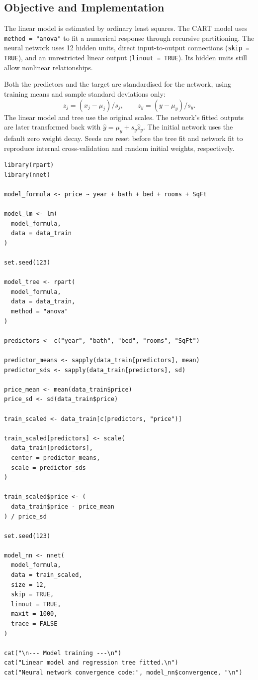\documentclass[11pt,a4paper]{article}
\begin{document}
\subsection{Objective and Implementation}
The linear model is estimated by ordinary least squares. The CART model uses \texttt{method = "anova"} to fit a numerical response through recursive partitioning. The neural network uses 12 hidden units, direct input-to-output connections (\texttt{skip = TRUE}), and an unrestricted linear output (\texttt{linout = TRUE}). Its hidden units still allow nonlinear relationships.

Both the predictors and the target are standardised for the network, using training means and sample standard deviations only:
\[
z_j=(x_j-\mu_j)/s_j,\qquad z_y=(y-\mu_y)/s_y.
\]
The linear model and tree use the original scales. The network's fitted outputs are later transformed back with $\hat y=\mu_y+s_y\hat z_y$. The initial network uses the default zero weight decay. Seeds are reset before the tree fit and network fit to reproduce internal cross-validation and random initial weights, respectively.
\begin{lstlisting}
library(rpart)
library(nnet)

model_formula <- price ~ year + bath + bed + rooms + SqFt

model_lm <- lm(
  model_formula,
  data = data_train
)

set.seed(123)

model_tree <- rpart(
  model_formula,
  data = data_train,
  method = "anova"
)

predictors <- c("year", "bath", "bed", "rooms", "SqFt")

predictor_means <- sapply(data_train[predictors], mean)
predictor_sds <- sapply(data_train[predictors], sd)

price_mean <- mean(data_train$price)
price_sd <- sd(data_train$price)

train_scaled <- data_train[c(predictors, "price")]

train_scaled[predictors] <- scale(
  data_train[predictors],
  center = predictor_means,
  scale = predictor_sds
)

train_scaled$price <- (
  data_train$price - price_mean
) / price_sd

set.seed(123)

model_nn <- nnet(
  model_formula,
  data = train_scaled,
  size = 12,
  skip = TRUE,
  linout = TRUE,
  maxit = 1000,
  trace = FALSE
)

cat("\n--- Model training ---\n")
cat("Linear model and regression tree fitted.\n")
cat("Neural network convergence code:", model_nn$convergence, "\n")
\end{lstlisting}
\end{document}
